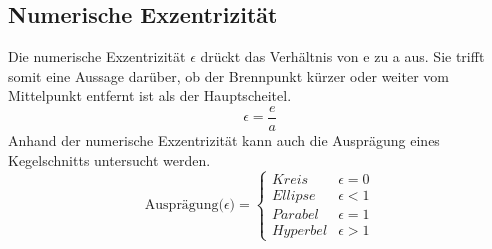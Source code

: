 \subsection{Numerische Exzentrizität}
Die numerische Exzentrizität $\epsilon$ drückt das Verhältnis von e zu a aus. Sie trifft somit eine Aussage darüber, ob der Brennpunkt kürzer oder weiter vom Mittelpunkt entfernt ist als der Hauptscheitel.
\begin{displaymath}
	\epsilon = \frac{e}{a}
\end{displaymath}
Anhand der numerische Exzentrizität kann auch die Ausprägung eines Kegelschnitts untersucht werden.
\begin{displaymath}
   \text{Ausprägung($\epsilon$)} = \left\{
     \begin{array}{lr}
       Kreis & \epsilon = 0 \\
       Ellipse & \epsilon < 1\\
       Parabel & \epsilon = 1\\
       Hyperbel & \epsilon > 1
     \end{array}
   \right.
\end{displaymath}
